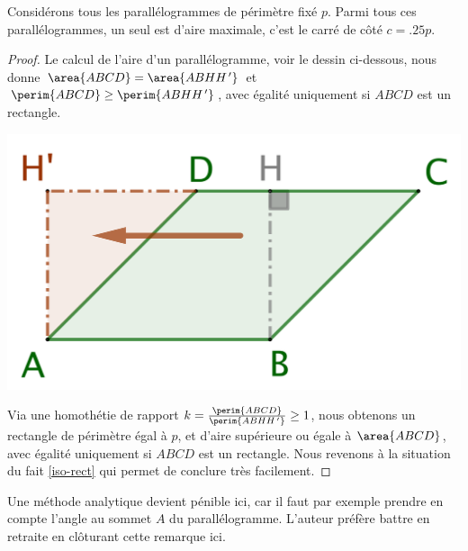 \begin{fact} \label{iso-para}
	Considérons tous les parallélogrammes de périmètre fixé $p$. Parmi tous ces parallélogrammes, un seul est d'aire maximale, c'est le carré de côté $c = \num{.25} p$.
\end{fact}


\begin{proof}
	Le calcul de l'aire d'un parallélogramme, voir le dessin ci-dessous, nous donne 
	$\area{ABCD} = \area{ABHH^{\,\prime}}$ et 
	$\perim{ABCD} \geq \perim{ABHH^{\,\prime}}$, 
	avec égalité uniquement si $ABCD$ est un rectangle. 
	
	\begin{center}
		\includegraphics[scale=.4]{content/parallelogram/para-2-rect.png}
	\end{center}
	
	Via une homothétie de rapport $k = \frac{\perim{ABCD}}{\perim{ABHH^{\,\prime}}} \geq 1$, nous obtenons un rectangle 
	de périmètre égal à $p$,
	et d'aire supérieure ou égale à $\area{ABCD}$, 
	avec égalité uniquement si $ABCD$ est un rectangle.
	Nous revenons à la situation du fait \ref{iso-rect} qui permet de conclure très facilement.
\end{proof}




\begin{remark}
	Une méthode analytique devient pénible ici, car il faut par exemple prendre en compte l'angle au sommet $A$ du parallélogramme. L'auteur préfère battre en retraite en clôturant cette remarque ici.
\end{remark}
